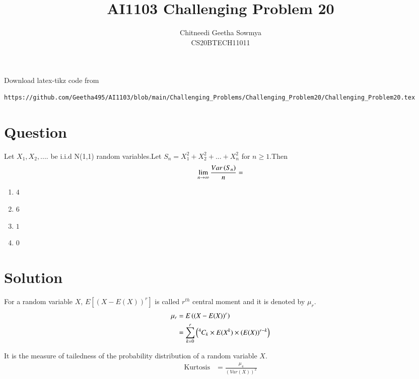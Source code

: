 \documentclass[journal,12pt,twocolumn]{IEEEtran}
\begin{document}
     \def\rightbox#1{\makebox[0in][r]{#1}}
     \def\centbox#1{\makebox[0in]{#1}}
     \def\topbox#1{\raisebox{-\baselineskip}[0in][0in]{#1}}
     \def\midbox#1{\raisebox{-0.5\baselineskip}[0in][0in]{#1}}
\vspace{3cm}
\title{AI1103 Challenging Problem 20}
\author{Chitneedi Geetha Sowmya \\ CS20BTECH11011}
\maketitle
\newpage
\bigskip
\renewcommand{\thefigure}{\theenumi}
\renewcommand{\thetable}{\theenumi}
\newcommand{\dsum}{\displaystyle\sum}
\newcommand{\R}{\mathbb{R}}
\newcommand{\C}{\mathbb{C}}
Download  latex-tikz code from 
%
\begin{lstlisting}
https://github.com/Geetha495/AI1103/blob/main/Challenging_Problems/Challenging_Problem20/Challenging_Problem20.tex\end{lstlisting}

\section{Question}
Let $X_{1},X_{2},....$ be i.i.d N(1,1) random variables.Let $S_{n}=X_{1}^{2}+X_{2}^2+...+X_{n}^{2}$ for $n\ge1$.Then $$\lim_{n \to \infty}{\frac{Var\left(S_{n}\right)}{n}}=$$
\begin{enumerate}[label = (\Alph*)]
\item  $4$
\item  $6$
\item  $1$
\item  $0$
\end{enumerate}
\section{Solution}
\begin{definition}
 For a random variable $X$, $E\left[(X-E(X))^r\right]$ is called $r^{th} $ central moment and it is denoted by $\mu_r$.
\begin{align}
    \mu_r &= E\left((X-E(X))^r\right) \nonumber\\
    &= \sum_{k=0}^r \left({}^{4}C_{k} \times E(X^k) \times (E(X))^{r-k}\right)
    \label{eq:2}
\end{align}
\end{definition}
\begin{definition}[Kurtosis]
 It is the measure of tailedness of the probability distribution of a random variable $X$.
\begin{align*}
    \text{Kurtosis} &= \frac{\mu_4}{( Var(X) )^2}\\
\end{align*}
\end{definition}
 
\end{document}
